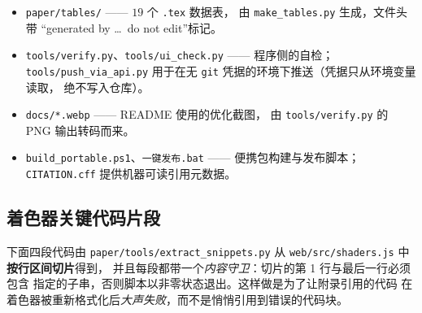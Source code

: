\begin{itemize}[leftmargin=1.6em,itemsep=2.5pt,topsep=3pt]
  \item \texttt{paper/tables/} —— $19$ 个 \texttt{.tex} 数据表，
        由 \texttt{make\_tables.py} 生成，文件头带
        “generated by \dots\ do not edit”标记。
  \item \texttt{tools/verify.py}、\texttt{tools/ui\_check.py} ——
        程序侧的自检；\texttt{tools/push\_via\_api.py} 用于在无
        \texttt{git} 凭据的环境下推送（凭据只从环境变量读取，
        绝不写入仓库）。
  \item \texttt{docs/*.webp} —— README 使用的优化截图，
        由 \texttt{tools/verify.py} 的 PNG 输出转码而来。
  \item \texttt{build\_portable.ps1}、\texttt{一键发布.bat} ——
        便携包构建与发布脚本；\texttt{CITATION.cff} 提供机器可读引用元数据。
\end{itemize}

\subsection{着色器关键代码片段}\label{app:code}

下面四段代码由 \texttt{paper/tools/extract\_snippets.py} 从
\texttt{web/src/shaders.js} 中\textbf{按行区间切片}得到，
并且每段都带一个\emph{内容守卫}：切片的第 1 行与最后一行必须包含
指定的子串，否则脚本以非零状态退出。这样做是为了让附录引用的代码
在着色器被重新格式化后\emph{大声失败}，而不是悄悄引用到错误的代码块。

\setcounter{listing}{5}

\begin{listing}[t]
\caption{Schwarzschild 零测地线方程与其 RK4 步进。状态向量为 $s=(u,\dd u/\dd\varphi)$，导数 $\dd s/\dd\varphi = (\dd u/\dd\varphi,\;-u+3\M u^2)$，即式~\eqref{eq:geodesic} 的一阶化形式。三段 \texttt{geoDeriv} 调用对应 RK4 的四个一级导数，权重 $1/6,1/3,1/3,1/6$。这段代码在每个像素上执行，是整条渲染管线的物理核心。}
\label{lst:apx-ode}

\end{listing}

\begin{listing}[t]
\caption{亚像素抖动与累积采样位置。像素内的采样点由 Cranley--Patterson 旋转的 $R_2$ 低差异序列给出：旋转量对每个像素是常量（因此固定采样序号下捕获结果逐位可重复），而采样序号按黄金比例型向量推进，使样本在像素内分层而非像独立均匀噪声那样成团。这就是第~\ref{sec:v6} 节中“先修复抖动相位、再修复 8\,bit 量化时序”之后残差按 $n^{-0.29}$ 下降的直接来源。}
\label{lst:apx-jitter}

\end{listing}

